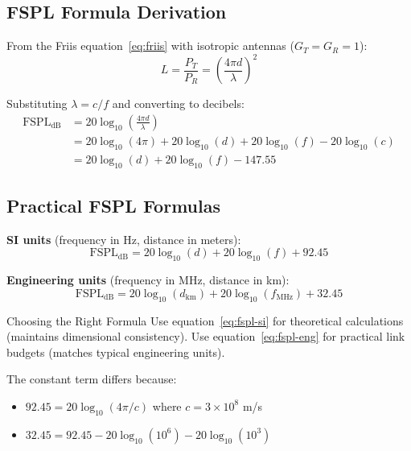 \subsection{FSPL Formula Derivation}

From the Friis equation~\eqref{eq:friis} with isotropic antennas ($G_T = G_R = 1$):
\begin{equation}
L = \frac{P_T}{P_R} = \left(\frac{4\pi d}{\lambda}\right)^2
\label{eq:fspl-linear}
\end{equation}

Substituting $\lambda = c/f$ and converting to decibels:
\begin{align}
\text{FSPL}_{\text{dB}} &= 20\log_{10}\left(\frac{4\pi d}{\lambda}\right) \nonumber \\
&= 20\log_{10}(4\pi) + 20\log_{10}(d) + 20\log_{10}(f) - 20\log_{10}(c) \nonumber \\
&= 20\log_{10}(d) + 20\log_{10}(f) - 147.55
\label{eq:fspl-derivation}
\end{align}

\subsection{Practical FSPL Formulas}

\textbf{SI units} (frequency in Hz, distance in meters):
\begin{equation}
\boxed{\text{FSPL}_{\text{dB}} = 20\log_{10}(d) + 20\log_{10}(f) + 92.45}
\label{eq:fspl-si}
\end{equation}

\textbf{Engineering units} (frequency in MHz, distance in km):
\begin{equation}
\boxed{\text{FSPL}_{\text{dB}} = 20\log_{10}(d_{\text{km}}) + 20\log_{10}(f_{\text{MHz}}) + 32.45}
\label{eq:fspl-eng}
\end{equation}

\begin{calloutbox}{Choosing the Right Formula}
Use equation~\eqref{eq:fspl-si} for theoretical calculations (maintains dimensional consistency). Use equation~\eqref{eq:fspl-eng} for practical link budgets (matches typical engineering units).

The constant term differs because:
\begin{itemize}
\item $92.45 = 20\log_{10}(4\pi/c)$ where $c = 3\times10^8$ m/s
\item $32.45 = 92.45 - 20\log_{10}(10^6) - 20\log_{10}(10^3)$
\end{itemize}
\end{calloutbox}

